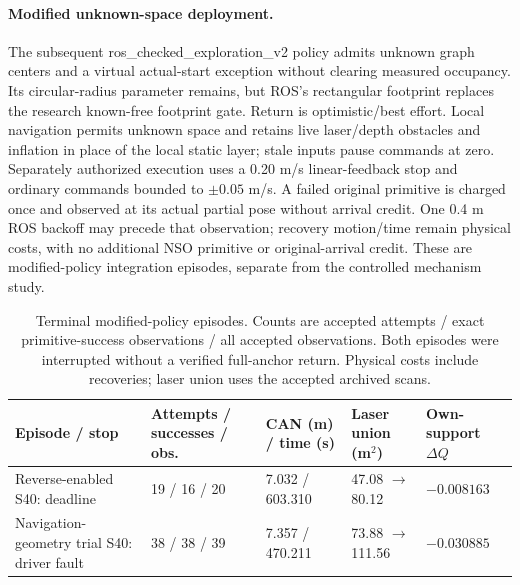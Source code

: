 \paragraph{Modified unknown-space deployment.}
The subsequent ros\_checked\_exploration\_v2 policy admits unknown graph centers and a virtual actual-start exception without clearing measured occupancy. Its circular-radius parameter remains, but ROS's rectangular footprint replaces the research known-free footprint gate. Return is optimistic/best effort. Local navigation permits unknown space and retains live laser/depth obstacles and inflation in place of the local static layer; stale inputs pause commands at zero. Separately authorized execution uses a 0.20 m/s linear-feedback stop and ordinary commands bounded to $\pm0.05$ m/s. A failed original primitive is charged once and observed at its actual partial pose without arrival credit. One 0.4 m ROS backoff may precede that observation; recovery motion/time remain physical costs, with no additional NSO primitive or original-arrival credit. These are modified-policy integration episodes, separate from the controlled mechanism study.

\begin{table}[!htbp]
\caption{Terminal modified-policy episodes. Counts are accepted attempts / exact primitive-success observations / all accepted observations. Both episodes were interrupted without a verified full-anchor return. Physical costs include recoveries; laser union uses the accepted archived scans.}\label{tab:modified-terminal}
\small\renewcommand{\arraystretch}{1.12}\setlength{\tabcolsep}{3pt}
\begin{tabular}{@{}>{\raggedright\arraybackslash}p{.24\linewidth}p{.16\linewidth}p{.18\linewidth}p{.20\linewidth}p{.14\linewidth}@{}}
\toprule
Episode / stop & Attempts / successes / obs. & CAN (m) / time (s) & Laser union (m$^2$) & Own-support $\Delta Q$ \\
\midrule
Reverse-enabled S40: deadline & 19 / 16 / 20 & 7.032 / 603.310 & 47.08 $\to$ 80.12 & $-0.008163$ \\
Navigation-geometry trial S40: driver fault & 38 / 38 / 39 & 7.357 / 470.211 & 73.88 $\to$ 111.56 & $-0.030885$ \\
\bottomrule
\end{tabular}
\end{table}

